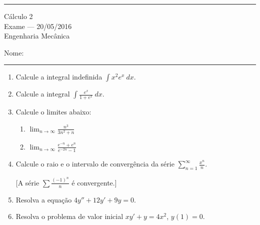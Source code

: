 \documentclass{article}
\newcommand{\ds}{\displaystyle}
\begin{document}
\noindent{}\rule{\textwidth}{0.4pt}
\begin{center}
	C\'alculo 2\\
	Exame --- 20/05/2016 \\
	Engenharia Mec\^anica \\
	\vspace{0.2cm}
\end{center}
Nome: \\
\noindent{}\rule{\textwidth}{0.4pt}

\begin{enumerate}
\item Calcule a integral indefinida $\ds\int x^2e^x\ dx$.

\item Calcule a integral $\ds\int \frac{e^x}{1+e^x}\ dx$.

\item Calcule o limites abaixo:
	\begin{enumerate}
		\item $\ds\lim_{n\rightarrow\infty}\frac{n^3}{3n^2+n}$
		\item $\ds\lim_{n\rightarrow\infty}\frac{e^{-n}+e^n}{e^{-2n}-1}$
	\end{enumerate}

\item Calcule o raio e o intervalo de converg\^encia da s\'erie $\ds\sum_{n=1}^\infty \frac{x^n}{n}$.

[A s\'erie $\sum\frac{(-1)^n}{n}$ \'e convergente.]

\item Resolva a equa\c{c}\~ao $\ds 4y''+12y'+9y=0$.

\item Resolva o problema de valor inicial $\ds xy'+y=4x^2$, $y(1)=0$.

\end{enumerate}
\end{document}
